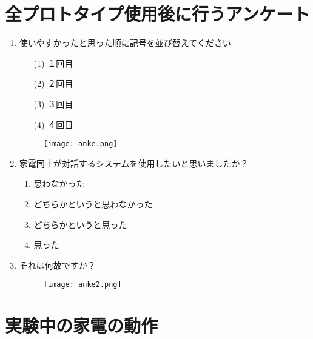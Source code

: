 \documentclass[a4j,12pt,twoside]{jreport}
\begin{document}
\chapter{全プロトタイプ使用後に行うアンケート}
\label{sec:after}
\begin{enumerate}
	\item 使いやすかったと思った順に記号を並び替えてください
	\begin{enumerate}
		\item[(1)] １回目
		\item[(2)] ２回目
		\item[(3)] ３回目
		\item[(4)] ４回目
	\end{enumerate}
\begin{figure}[H]
  \centering
  \texttt{[image: anke.png]}
\end{figure}
	\item 家電同士が対話するシステムを使用したいと思いましたか？
	\begin{enumerate}
		\item 思わなかった
		\item どちらかというと思わなかった
		\item どちらかというと思った
		\item 思った
	\end{enumerate}
		\item それは何故ですか？
\begin{figure}[H]
  \centering
  \texttt{[image: anke2.png]}
\end{figure}
\end{enumerate}


\newpage
\chapter{実験中の家電の動作}
\label{sec:action}
\end{document}
